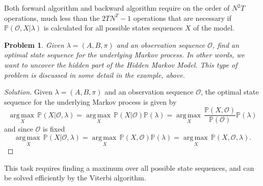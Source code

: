 \documentclass[12pt]{article}
\newtheorem{problem}{Problem}
\newenvironment{solution}
  {\renewcommand\qedsymbol{$\blacksquare$}\begin{proof}[Solution]}
  {\end{proof}}
\def\OO{\mathcal{O}}
\def\PP{\mathbb{P}}
\DeclareMathOperator{\argmax}{arg\,max\,}
\numberwithin{equation}{section}
\begin{document}
Both forward algorithm and backward algorithm require on the order of $N^{2}T$ operations, much less than the $2TN^{T}-1$ operations that are necessary if $\PP(\OO,X|\lambda)$ is calculated for all possible states sequences $X$ of the model.


\begin{problem}\label{Problem 2}
    Given $\lambda = (A, B, \pi)$ and an observation sequence $\OO$, find an optimal state sequence for the underlying Markov process. In other words, we want to uncover the hidden part of the Hidden Markov Model. This type of problem is discussed in some detail in the example, above.
\end{problem}

\begin{solution}
Given $\lambda = (A, B, \pi)$ and an observation sequence $\OO$, the optimal state sequence for the underlying Markov process is given by
\[\underset{X}{\argmax} \PP(X|\OO,\lambda) = \underset{X}{\argmax} \PP(X|\OO) \PP(\lambda) = \underset{X}{\argmax} \frac{\PP(X,\OO)}{\PP(\OO)} \PP(\lambda)\]
and since $\OO$ is fixed
\begin{equation}\label{P(X,O,l)}
\underset{X}{\argmax} \PP(X|\OO,\lambda) = \underset{X}{\argmax} \PP(X,\OO) \PP(\lambda) = \underset{X}{\argmax} \PP(X,\OO,\lambda).
\end{equation}
\end{solution}

This task requires finding a maximum over all possible state sequences, and can be solved efficiently by the Viterbi algorithm.
\end{document}

